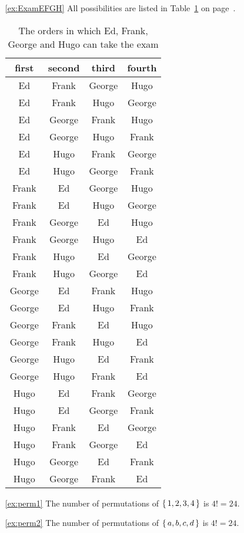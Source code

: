 \begin{enumerate}
\item[\ref{ex:ExamEFGH}]
All possibilities are listed in Table~\ref{tab:ExamEFGH} on page~\pageref{tab:ExamEFGH}. 

\begin{table}[!htb]
\caption{The orders in which Ed, Frank, George and Hugo can take the exam}\label{tab:ExamEFGH}
\begin{center}
\begin{tabular}{c|c|c|c}
first & second & third & fourth\\
\hline
Ed & Frank & George & Hugo \\
Ed & Frank & Hugo & George \\
Ed & George & Frank & Hugo \\
Ed & George & Hugo & Frank \\
Ed & Hugo & Frank & George \\
Ed & Hugo & George & Frank \\
Frank & Ed & George & Hugo \\
Frank & Ed & Hugo & George \\
Frank & George & Ed & Hugo \\
Frank & George & Hugo & Ed \\
Frank & Hugo & Ed & George \\
Frank & Hugo & George & Ed \\
George & Ed & Frank & Hugo \\
George & Ed & Hugo & Frank \\
George & Frank & Ed & Hugo \\
George & Frank & Hugo & Ed \\
George & Hugo & Ed & Frank \\
George & Hugo & Frank & Ed \\
Hugo & Ed & Frank & George \\
Hugo & Ed & George & Frank \\
Hugo & Frank & Ed & George \\
Hugo & Frank & George & Ed \\
Hugo & George& Ed & Frank \\
Hugo & George & Frank & Ed 
\end{tabular}
\end{center}
\end{table}

\item[\ref{ex:perm1}]
The number of permutations of $\left\{\,1, 2, 3, 4\,\right\}$ is $4! =24$. 

\item[\ref{ex:perm2}]
The number of permutations of $\left\{\,a, b, c, d\,\right\}$ is $4! =24$. 


\end{enumerate}
